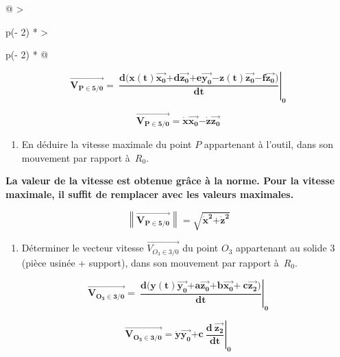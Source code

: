 \begin{longtable}{@{}
  >{\raggedright\arraybackslash}p{(\columnwidth - 2\tabcolsep) * }
  >{\raggedright\arraybackslash}p{(\columnwidth - 2\tabcolsep) * }@{}}
\begin{minipage}[b]{\linewidth}
\[\overrightarrow{\mathbf{V}_{\mathbf{P}\mathbf{\in}\mathbf{5/0}}}\mathbf{=}\left. \ \frac{\mathbf{d}\mathbf{(}\mathbf{x}\left( \mathbf{t} \right)\overrightarrow{\mathbf{x}_{\mathbf{0}}}\mathbf{+ d}\overrightarrow{\mathbf{z}_{\mathbf{0}}}\mathbf{+}\mathbf{e}\overrightarrow{\mathbf{y}_{\mathbf{0}}}\mathbf{- z}\left( \mathbf{t} \right)\overrightarrow{\mathbf{z}_{\mathbf{0}}}\mathbf{- f}\overrightarrow{\mathbf{z}_{\mathbf{0}}}\mathbf{)}}{\mathbf{dt}} \right|_{\mathbf{0}}\]

\[\overrightarrow{\mathbf{V}_{\mathbf{P}\mathbf{\in}\mathbf{5/0}}}\mathbf{=}\dot{\mathbf{x}}\overrightarrow{\mathbf{x}_{\mathbf{0}}}\mathbf{-}\dot{\mathbf{z}}\overrightarrow{\mathbf{z}_{\mathbf{0}}}\]

\begin{enumerate}
\def\labelenumi{\arabic{enumi}.}
\setcounter{enumi}{3}
\item
  En déduire la vitesse maximale du point \(P\) appartenant à l'outil,
  dans son mouvement par rapport à~\(R_{0}\).
\end{enumerate}

\textbf{La valeur de la vitesse est obtenue grâce à la norme. Pour la
vitesse maximale, il suffit de remplacer avec les valeurs maximales.}

\[\left\| \overrightarrow{\mathbf{V}_{\mathbf{P}\mathbf{\in}\mathbf{5/0}}} \right\|\mathbf{=}\sqrt{{\dot{\mathbf{x}}}^{\mathbf{2}}\mathbf{+}{\dot{\mathbf{z}}}^{\mathbf{2}}}\]

\begin{enumerate}
\def\labelenumi{\arabic{enumi}.}
\setcounter{enumi}{4}
\item
  Déterminer le vecteur vitesse \(\overrightarrow{V_{O_{3} \in 3/0}}\)
  du point \(O_{3}\) appartenant au solide 3 (pièce usinée + support),
  dans son mouvement par rapport à~\(R_{0}\).
\end{enumerate}

\[\overrightarrow{\mathbf{V}_{\mathbf{O}_{\mathbf{3}}\mathbf{\in}\mathbf{3/0}}}\mathbf{=}\left. \ \frac{\mathbf{d}\mathbf{(}\mathbf{y}\left( \mathbf{t} \right)\overrightarrow{\mathbf{y}_{\mathbf{0}}}\mathbf{+}\mathbf{a}\overrightarrow{\mathbf{z}_{\mathbf{0}}}\mathbf{+}\mathbf{b}\overrightarrow{\mathbf{x}_{\mathbf{0}}}\mathbf{+}\mathbf{\ }\mathbf{c}\overrightarrow{\mathbf{z}_{\mathbf{2}}}\mathbf{)}}{\mathbf{dt}} \right|_{\mathbf{0}}\]

\[\overrightarrow{\mathbf{V}_{\mathbf{O}_{\mathbf{3}}\mathbf{\in}\mathbf{3/0}}}\mathbf{=}\dot{\mathbf{y}}\overrightarrow{\mathbf{y}_{\mathbf{0}}}\mathbf{+ c}\left. \ \frac{\mathbf{d}\mathbf{\ }\overrightarrow{\mathbf{z}_{\mathbf{2}}}}{\mathbf{dt}} \right|_{\mathbf{0}}\]


\end{minipage}
\end{longtable}
